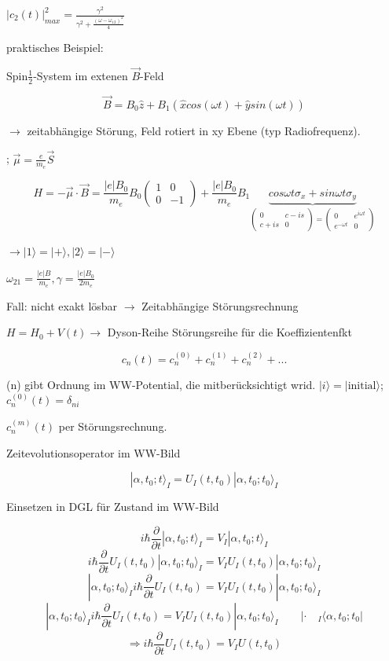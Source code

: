 \(|c_2(t)|^2_{max}=\frac{\gamma^2}{\gamma^2+\frac{(\omega-\omega_{12})^2}{4}}\)

praktisches Beispiel:

Spin\(\frac{1}{2}\)-System im extenen \(\vec B\)-Feld

\[ \vec B = B_0\hat z + B_1(\hat x cos(\omega t)+ \hat y sin(\omega t))\]

\(\rightarrow\) zeitabhängige Störung, Feld rotiert in xy Ebene (typ Radiofrequenz).

; \(\vec \mu = \frac{e}{m_e}\vec S\)

\[H=-\vec \mu\cdot\vec B = \frac{|e|B_0}{m_e}B_0\begin{pmatrix} 1&0\\0&-1 \end{pmatrix} +\frac{|e|B_0}{m_e}B_1\underbrace{cos\omega t \sigma_x+ sin\omega t \sigma_y}_{\begin{pmatrix}0&c-is\\c+is&0\end{pmatrix}=\begin{pmatrix}0&e^{i\omega t}\\e^{-\omega t}&0\end{pmatrix}}\]

\(\rightarrow |1\rangle = |+\rangle,|2\rangle=|-\rangle\)

\(\omega_{21} = \frac{|e|B}{m_e},\gamma = \frac{|e|B_0}{2m_e}\)

Fall: nicht exakt lösbar \(\rightarrow\) Zeitabhängige Störungsrechnung

\(H= H_0+V(t)\rightarrow\) Dyson-Reihe Störungsreihe für die Koeffizientenfkt

\[ c_n(t) = c_n^{(0)} +c_n^{(1)} +c_n^{(2)} + ... \]

(n) gibt Ordnung im WW-Potential, die mitberücksichtigt wrid. \(|i\rangle = |\text{initial}\rangle\); \(c_n^{(0)}(t) = \delta_{ni}\)

\(c_n^{(m)}(t)\) per Störungsrechnung. 

Zeitevolutionsoperator im WW-Bild

\[ |\alpha,t_0;t\rangle_I = U_I(t,t_0)|\alpha,t_0;t_0\rangle_I\]

Einsetzen in DGL für Zustand im WW-Bild

\[ i\hbar \frac{\partial}{\partial t}|\alpha,t_0;t\rangle_I  = V_I|\alpha,t_0;t\rangle_I \]
\[ i\hbar \frac{\partial}{\partial t}  U_I(t,t_0)|\alpha,t_0;t_0\rangle_I = V_I U_I(t,t_0)|\alpha,t_0;t_0\rangle_I  \]
\[|\alpha,t_0;t_0\rangle_I  i\hbar \frac{\partial}{\partial t}  U_I(t,t_0) = V_I U_I(t,t_0)|\alpha,t_0;t_0\rangle_I  \]
\[|\alpha,t_0;t_0\rangle_I  i\hbar \frac{\partial}{\partial t}  U_I(t,t_0) = V_I U_I(t,t_0)|\alpha,t_0;t_0\rangle_I \qquad |\cdot\quad _I\langle \alpha,t_0;t_0| \]
\[\Rightarrow i\hbar  \frac{\partial}{\partial t}U_I(t,t_0) = V_IU(t,t_0)\]

